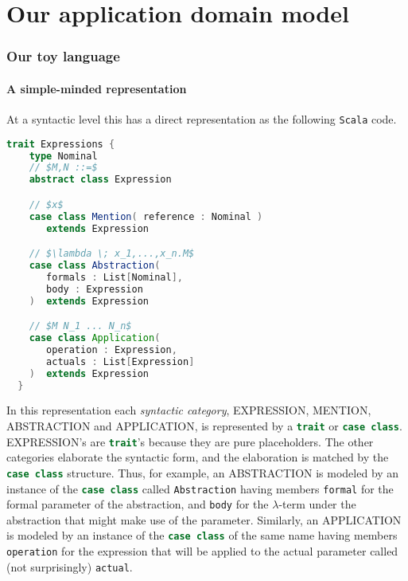 \section{Our application domain model}

\subsubsection{Our toy language}

\paragraph{A simple-minded representation}
At a syntactic level this has a direct representation as the following
\texttt{Scala} code.

\break
\begin{lstlisting}[language=Scala,mathescape=true]
  trait Expressions {
    type Nominal    
    // $M,N ::=$
    abstract class Expression

    // $x$
    case class Mention( reference : Nominal )
       extends Expression

    // $\lambda \; x_1,...,x_n.M$
    case class Abstraction(
       formals : List[Nominal],
       body : Expression
    )  extends Expression

    // $M N_1 ... N_n$
    case class Application(
       operation : Expression,
       actuals : List[Expression]
    )  extends Expression        
  }
\end{lstlisting}

In this representation each \emph{syntactic category}, EXPRESSION, MENTION,
ABSTRACTION and APPLICATION, is represented by a
\lstinline[language=Scala]!trait! or \lstinline[language=Scala]!case class!.
EXPRESSION's are \lstinline[language=Scala]!trait!'s because they
are pure placeholders. The other categories elaborate the syntactic
form, and the elaboration is matched by the
\lstinline[language=Scala]!case class!  structure. Thus, for example,
an ABSTRACTION is modeled by an instance of the
\lstinline[language=Scala]!case class! called
\lstinline[language=Scala]!Abstraction! having members
\lstinline[language=Scala]!formal! for the formal parameter of the
abstraction, and \lstinline[language=Scala]!body! for the
$\lambda$-term under the abstraction that might make use of the
parameter. Similarly, an APPLICATION is modeled by an instance of the
\lstinline[language=Scala]!case class! of the same name having members
\lstinline[language=Scala]!operation! for the expression that will be applied
to the actual parameter called (not surprisingly)
\lstinline[language=Scala]!actual!.

